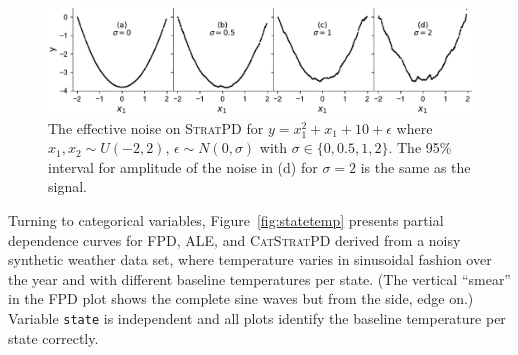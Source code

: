 \documentclass[]{article} %
\newcommand{\figref}[1]{Figure~\ref{#1}}
\newcommand{\spd}{\fontfamily{cmr}\textsc{\small StratPD}}
\newcommand{\cspd}{\fontfamily{cmr}\textsc{\small CatStratPD}}
\begin{document}
\begin{figure}[!htbp]
\begin{center}
\includegraphics[scale=0.45]{images/noise.pdf}\vspace{-2mm}\caption{\small The effective noise on \spd{} for $y = x_1^2 + x_1 + 10 + \epsilon$ where $x_1,x_2 \sim U(-2,2)$, $\epsilon \sim N(0,\sigma)$ with $\sigma \in \{0,0.5,1,2\}$. The 95\% interval for amplitude of the noise in (d) for $\sigma=2$ is the same as the signal.}
\label{fig:noise}
\end{center}
\end{figure}

Turning to categorical variables, \figref{fig:statetemp} presents partial dependence curves for FPD, ALE, and \cspd{} derived from a noisy synthetic weather data set, where temperature varies in sinusoidal fashion over the year and with different baseline temperatures per state. (The vertical ``smear'' in the FPD plot shows the complete sine waves but from the side, edge on.)  Variable {\tt\small state} is independent and all plots identify the baseline temperature per state correctly.
\end{document}
